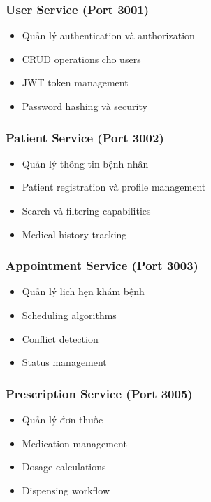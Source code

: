\documentclass[12pt,a4paper]{report}
\begin{document}
\subsubsection{User Service (Port 3001)}
\begin{itemize}
    \item Quản lý authentication và authorization
    \item CRUD operations cho users
    \item JWT token management
    \item Password hashing và security
\end{itemize}

\subsubsection{Patient Service (Port 3002)}
\begin{itemize}
    \item Quản lý thông tin bệnh nhân
    \item Patient registration và profile management
    \item Search và filtering capabilities
    \item Medical history tracking
\end{itemize}

\subsubsection{Appointment Service (Port 3003)}
\begin{itemize}
    \item Quản lý lịch hẹn khám bệnh
    \item Scheduling algorithms
    \item Conflict detection
    \item Status management
\end{itemize}

\subsubsection{Prescription Service (Port 3005)}
\begin{itemize}
    \item Quản lý đơn thuốc
    \item Medication management
    \item Dosage calculations
    \item Dispensing workflow
\end{itemize}
\end{document}
